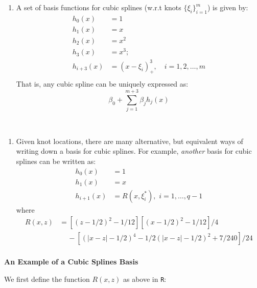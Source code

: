 \documentclass[
]{book}
\providecommand{\tightlist}{%
  \setlength{\itemsep}{0pt}\setlength{\parskip}{0pt}}
\begin{document}
\begin{enumerate}
\def\labelenumi{\arabic{enumi}.}
\tightlist
\item
  A set of basis functions for cubic splines (w.r.t knots \(\{\xi_i\}_{i=1}^m\)) is given by:
  \begin{align*}
    h_0(x)&= 1\\
     h_1(x)&=x\\
    h_2(x)&=x^2\\
    h_3(x)&=x^3;\\
    h_{i+3}(x) &= (x-\xi_i)_+^3,\quad i=1,2,\ldots,m\\
  \end{align*}
  That is, any cubic spline can be uniquely expressed as:
  \[ \beta_0 +\sum_{j=1}^{m+3}\beta_j h_j(x)\]
\end{enumerate}

~

\begin{enumerate}
\def\labelenumi{\arabic{enumi}.}
\setcounter{enumi}{1}
\tightlist
\item
  Given knot locations, there are many alternative, but equivalent ways of writing down a basis for cubic splines. For example, \emph{another} basis for cubic splines can be written as:
  \begin{align*}
  h_0(x) &= 1\\
  h_1(x) &= x\\
  h_{i+1}(x) &= R(x, \xi_i^*),\,\, i=1, \ldots, q-1
  \end{align*}
  where
  \begin{align*}
  R(x,z) &= \left[  (z-1/2)^2 - 1/12\right] \left[  (x-1/2)^2 - 1/12\right]/4\\
  & \quad \,- \left[  (|x-z|-1/2)^4 - 1/2   (|x-z|-1/2)^2 + 7/240\right] /24\\
  \end{align*}
\end{enumerate}

\textbf{An Example of a Cubic Splines Basis}

We first define the function \(R(x,z)\) as above in \texttt{R}:
\end{document}
